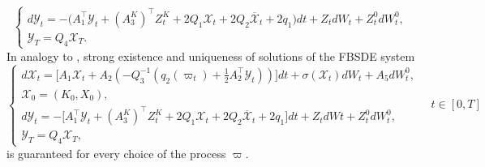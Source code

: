 \documentclass[11pt,twoside]{amsart}
\theoremstyle{definition}
\numberwithin{equation}{section}
\newcommand{\w}{\varpi}
\renewcommand{\bar}{\overline}
\begin{document}
\begin{equation} 
\label{eqn: mf adjoint process}
\begin{cases}
d\mathcal{Y}_t = -\big( A_1^\top \mathcal{Y}_t + (A^K_3)^\top Z^{K}_t + 2Q_1\mathcal{X}_t + 2Q_2 \bar{\mathcal{X}}_t + 2q_1 \big)dt + Z_t dW_t + Z^{0}_t dW^0_t ,\\
\mathcal{Y}_T = Q_4\mathcal{X}_T.
\end{cases}
\end{equation} 
In analogy to \cite[Proposition 4.2]{del2024mean}, strong existence and uniqueness of solutions of the FBSDE system
\begin{equation}
\label{eqn: mf FBSDE company}
\begin{cases}
d\mathcal{X}_t = \Big[A_1\mathcal{X}_t + A_2(-Q_3^{-1} (q_2(\w_t)+\frac{1}{2}A_2^\top \mathcal{Y}_t))\big]dt + \sigma(\mathcal{X}_t)dW_t + A_5dW^0_t,\\
\mathcal{X}_0=( K_0,X_0),\\
d\mathcal{Y}_t = -\Big[ A_1^\top \mathcal{Y}_t + (A^K_3)^\top Z^{K}_t + 2Q_1\mathcal{X}_t + 2Q_2 \bar{\mathcal{X}}_t + 2q_1 \Big]dt + Z_t dWt + Z^{0}_t dW^0_t ,\\
\mathcal{Y}_T = Q_4\mathcal{X}_T,
\end{cases}\quad t\in[0,T]
\end{equation} 
is guaranteed for every choice of the process $\w$. 
\end{document}
